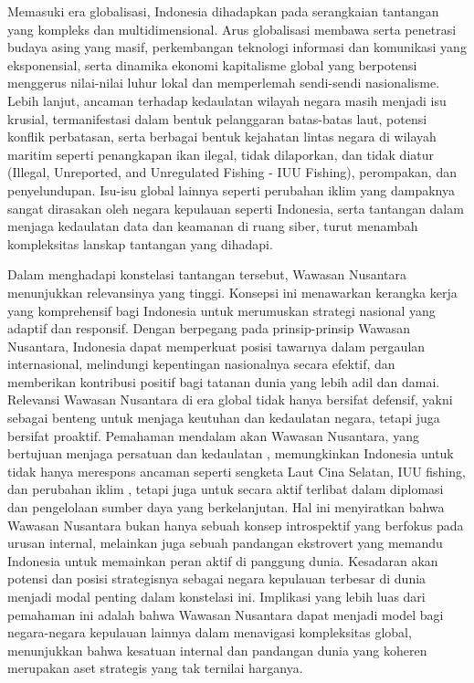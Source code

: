 \documentclass[12pt, a4paper]{article}
\begin{document}
Memasuki era globalisasi, Indonesia dihadapkan pada serangkaian tantangan yang kompleks dan multidimensional. Arus globalisasi membawa serta penetrasi budaya asing yang masif, perkembangan teknologi informasi dan komunikasi yang eksponensial, serta dinamika ekonomi kapitalisme global yang berpotensi menggerus nilai-nilai luhur lokal dan memperlemah sendi-sendi nasionalisme. Lebih lanjut, ancaman terhadap kedaulatan wilayah negara masih menjadi isu krusial, termanifestasi dalam bentuk pelanggaran batas-batas laut, potensi konflik perbatasan, serta berbagai bentuk kejahatan lintas negara di wilayah maritim seperti penangkapan ikan ilegal, tidak dilaporkan, dan tidak diatur (Illegal, Unreported, and Unregulated Fishing - IUU Fishing), perompakan, dan penyelundupan. Isu-isu global lainnya seperti perubahan iklim yang dampaknya sangat dirasakan oleh negara kepulauan seperti Indonesia, serta tantangan dalam menjaga kedaulatan data dan keamanan di ruang siber, turut menambah kompleksitas lanskap tantangan yang dihadapi.  

Dalam menghadapi konstelasi tantangan tersebut, Wawasan Nusantara menunjukkan relevansinya yang tinggi. Konsepsi ini menawarkan kerangka kerja yang komprehensif bagi Indonesia untuk merumuskan strategi nasional yang adaptif dan responsif. Dengan berpegang pada prinsip-prinsip Wawasan Nusantara, Indonesia dapat memperkuat posisi tawarnya dalam pergaulan internasional, melindungi kepentingan nasionalnya secara efektif, dan memberikan kontribusi positif bagi tatanan dunia yang lebih adil dan damai. Relevansi Wawasan Nusantara di era global tidak hanya bersifat defensif, yakni sebagai benteng untuk menjaga keutuhan dan kedaulatan negara, tetapi juga bersifat proaktif. Pemahaman mendalam akan Wawasan Nusantara, yang bertujuan menjaga persatuan dan kedaulatan , memungkinkan Indonesia untuk tidak hanya merespons ancaman seperti sengketa Laut Cina Selatan, IUU fishing, dan perubahan iklim , tetapi juga untuk secara aktif terlibat dalam diplomasi  dan pengelolaan sumber daya yang berkelanjutan. Hal ini menyiratkan bahwa Wawasan Nusantara bukan hanya sebuah konsep introspektif yang berfokus pada urusan internal, melainkan juga sebuah pandangan ekstrovert yang memandu Indonesia untuk memainkan peran aktif di panggung dunia. Kesadaran akan potensi dan posisi strategisnya sebagai negara kepulauan terbesar di dunia menjadi modal penting dalam konstelasi ini. Implikasi yang lebih luas dari pemahaman ini adalah bahwa Wawasan Nusantara dapat menjadi model bagi negara-negara kepulauan lainnya dalam menavigasi kompleksitas global, menunjukkan bahwa kesatuan internal dan pandangan dunia yang koheren merupakan aset strategis yang tak ternilai harganya.  
\end{document}
